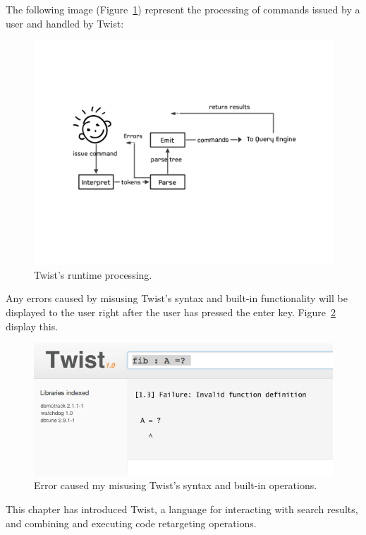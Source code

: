 The following image (Figure~\ref{fig:runtime}) represent the processing of commands issued by a user and handled by Twist:

\begin{figure}[!ht]
    \centering
    \includegraphics[width=\textwidth]{images/runtime}
    \caption{Twist's runtime processing.}
    \label{fig:runtime}
\end{figure} 

Any errors caused by misusing Twist's syntax and built-in functionality will be displayed to the user right after the user has pressed the enter key. Figure~\ref{fig:error} display this.

\begin{figure}[!ht]
    \centering
    \includegraphics[width=\textwidth]{images/error}
    \caption{Error caused my misusing Twist's syntax and built-in operations.}
    \label{fig:error}
\end{figure} 
 
 This chapter has introduced Twist, a language for interacting with search results, and combining and executing code retargeting operations. 
